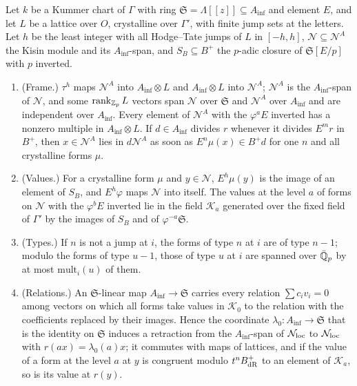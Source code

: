 \begin{theorem}\label{thm:B-kisin}
Let $k$ be a Kummer chart of $\Gamma$ with ring $\mathfrak S=\Lambda[\![z]\!]\subseteq A_{\inf}$ and element $E$, and let $L$ be a lattice over $O$, crystalline over $\Gamma'$, with finite jump sets at the letters. Let $h$ be the least integer with all Hodge--Tate jumps of $L$ in $[-h,h]$, $\mathcal N\subseteq\mathcal N^A$ the Kisin module and
its $A_{\inf}$-span, and $S_B\subseteq B^+$ the $p$-adic closure of $\mathfrak S[E/p]$ with $p$ inverted.
\begin{enumerate}[label=\textup{(\alph*)}]
\item (Frame.) $\tau^h$ maps $\mathcal N^A$ into $A_{\inf}\otimes L$ and $A_{\inf}\otimes L$ into $\mathcal N^A$; $\mathcal N^A$ is the $A_{\inf}$-span of $\mathcal N$, and some $\operatorname{rank}_{\mathbb{Z}_p}L$ vectors span $\mathcal N$ over $\mathfrak S$ and $\mathcal N^A$ over $A_{\inf}$ and are independent over $A_{\inf}$. Every element of
$\mathcal N^A$ with the $\varphi^aE$ inverted has a nonzero multiple in $A_{\inf}\otimes L$. If $d\in A_{\inf}$ divides $r$ whenever it divides $E^mr$ in $B^+$, then $x\in\mathcal N^A$ lies in $d\mathcal N^A$ as soon as $E^n\mu(x)\in B^+d$ for one $n$ and all crystalline forms $\mu$.
\item (Values.) For a crystalline form $\mu$ and $y\in\mathcal N$, $E^h\mu(y)$ is the image of an element of $S_B$, and $E^h\varphi$ maps $\mathcal N$ into itself. The values at the level $a$ of forms on $\mathcal N$ with the $\varphi^bE$ inverted lie in the field $\mathcal K_a$ generated over the fixed field of $\Gamma'$ by the
images of $S_B$ and of $\varphi^{-a}\mathfrak S$.
\item (Types.) If $n$ is not a jump at $i$, the forms of type $n$ at $i$ are of type $n-1$; modulo the forms of type $u-1$, those of type $u$ at $i$ are spanned over $\bar{\mathbb{Q}}_p$ by at most $\mathrm{mult}_i(u)$ of them.
\item (Relations.) An $\mathfrak S$-linear map $A_{\inf}\to\mathfrak S$ carries every relation $\sum c_iv_i=0$ among vectors on which all forms take values in $\mathcal K_0$ to the relation with the coefficients replaced by their images. Hence the coordinate $\lambda_0\colon A_{\inf}\to\mathfrak S$ that is the identity on $\mathfrak S$
induces a retraction from the $A_{\inf}$-span of $\mathcal N_{\rm loc}$ to $\mathcal N_{\rm loc}$ with $r(ax)=\lambda_0(a)x$; it commutes with maps of lattices, and if the value of a form at the level $a$ at $y$ is congruent modulo $t^nB_{\rm dR}^+$ to an element of $\mathcal K_a$, so is its value at $r(y)$.

\end{enumerate}
\end{theorem}
